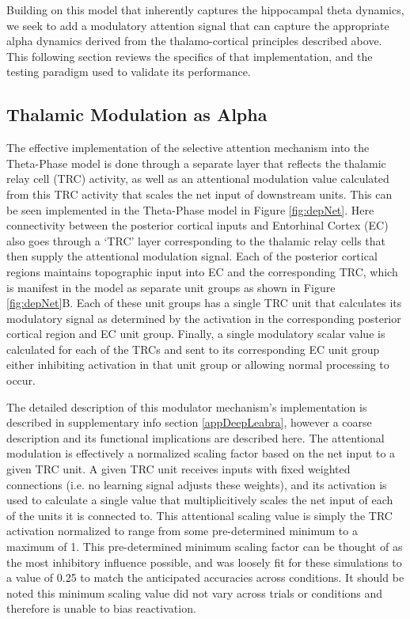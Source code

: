 \documentclass[11pt, titlepage, twoside]{article}
\begin{document}
Building on this model that inherently captures the hippocampal theta dynamics, we seek to add a modulatory attention signal that can capture the appropriate alpha dynamics derived from the thalamo-cortical principles described above.  This following section reviews the specifics of that implementation, and the testing paradigm used to validate its performance.


\subsection{Thalamic Modulation as Alpha}
\label{sec:attmod}
The effective implementation of the selective attention mechanism into the Theta-Phase model is done through a separate layer that reflects the thalamic relay cell (TRC) activity, as well as an attentional modulation value calculated from this TRC activity that scales the net input of downstream units.  This can be seen implemented in the Theta-Phase model in Figure \ref{fig:depNet}.  Here connectivity between the posterior cortical inputs and Entorhinal Cortex (EC) also goes through a `TRC' layer corresponding to the thalamic relay cells that then supply the attentional modulation signal.  Each of the posterior cortical regions maintains topographic input into EC and the corresponding TRC, which is manifest in the model as separate unit groups as shown in Figure \ref{fig:depNet}B.  Each of these unit groups has a single TRC unit that calculates its modulatory signal as determined by the activation in the corresponding posterior cortical region and EC unit group.  Finally, a single modulatory scalar value is calculated for each of the TRCs and sent to its corresponding EC unit group either inhibiting activation in that unit group or allowing normal processing to occur. 

The detailed description of this modulator mechanism's implementation is described in supplementary info section \ref{appDeepLeabra}, however a coarse description and its functional implications are described here.  The attentional modulation is effectively a normalized scaling factor based on the net input to a given TRC unit.  A given TRC unit receives inputs with fixed weighted connections (i.e. no learning signal adjusts these weights), and its activation is used to calculate a single value that multiplicitively scales the net input of each of the units it is connected to.  This attentional scaling value is simply the TRC activation normalized to range from some pre-determined minimum to a maximum of 1.  This pre-determined minimum scaling factor can be thought of as the most inhibitory influence possible, and was loosely fit for these simulations to a value of 0.25 to match the anticipated accuracies across conditions.  It should be noted this minimum scaling value did not vary across trials or conditions and therefore is unable to bias reactivation. 
\end{document}
